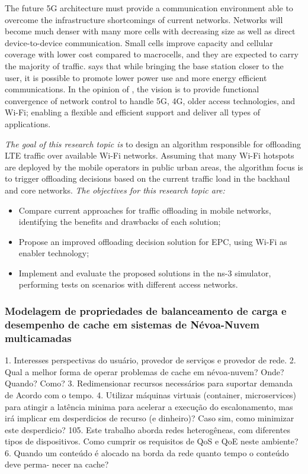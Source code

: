 The future 5G architecture must provide a communication environment able to
overcome the infrastructure shortcomings of current networks. Networks will
become much denser with many more cells with decreasing size as well as direct
device-to-device communication. Small cells improve capacity and cellular
coverage with lower cost compared to macrocells, and they are expected to carry
the majority of traffic. \citet{Pierucci2015} says that while bringing the base
station closer to the user, it is possible to promote lower power use and more
energy efficient communications. In the opinion of \citet{Einsiedler2015}, the
vision is to provide functional convergence of network control to handle 5G,
4G, older access technologies, and Wi-Fi; enabling a flexible and efficient
support and deliver all types of applications.

\emph{The goal of this research topic is} to design an algorithm responsible
for offloading \ac{LTE} traffic over available Wi-Fi networks. Assuming that
many Wi-Fi hotspots are deployed by the mobile operators in public urban areas,
the algorithm focus is to trigger offloading decisions based on the current
traffic load in the backhaul and core networks.
\emph{The objectives for this research topic are:}
\begin{itemize}
  \item Compare current approaches for traffic offloading in mobile networks,
  identifying the benefits and drawbacks of each solution;

  \item Propose an improved offloading decision solution for \ac{EPC}, using
  Wi-Fi as enabler technology;

  \item Implement and evaluate the proposed solutions in the \ac{ns-3}
  simulator, performing tests on scenarios with different access networks.
\end{itemize}


\subsubsection{Modelagem de propriedades de balanceamento de carga e desempenho de cache
em sistemas de Névoa-Nuvem multicamadas}
\label{subsec:handover}

1. Interesses perspectivas do usuário, provedor de serviços e provedor de rede.
2. Qual a melhor forma de operar problemas de cache em névoa-nuvem? Onde? Quando?
Como?
3. Redimensionar recursos necessários para suportar demanda de Acordo com o tempo.
4. Utilizar máquinas virtuais (container, microservices) para atingir a latência minima para
acelerar a execução do escalonamento, mas irá implicar em desperdicios de recurso (e
dinheiro)? Caso sim, como minimizar este desperdicio?
105. Este trabalho aborda redes heterogêneas, com diferentes tipos de dispositivos. Como
cumprir os requisitos de QoS e QoE neste ambiente?
6. Quando um conteúdo é alocado na borda da rede quanto tempo o conteúdo deve perma-
necer na cache?

